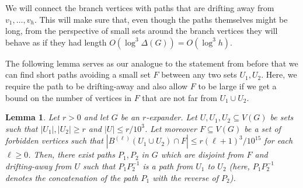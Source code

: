 \documentclass[10pt, a4paper]{article}
\numberwithin{theorem}{section} %
\newtheorem{lemma}[theorem]{Lemma}
\theoremstyle{remark}
\theoremstyle{definition}
\begin{document}
\noindent We will connect the branch vertices with paths that are drifting away from $v_1, \dots, v_h$.
This will make sure that, even though the paths themselves might be long, from the perspective of small sets around the branch vertices they will behave as if they had length $O(\log^3\Delta(G)) = O(\log^3h)$.

The following lemma serves as our analogue to the statement from before that we can find short paths avoiding a small set $F$ between any two sets $U_1, U_2$.
Here, we require the path to be drifting-away and also allow $F$ to be large if we get a bound on the number of vertices in $F$ that are not far from $U_1 \cup U_2$.
\begin{lemma}\label{lemma:drifting_away_paths}
    Let $r > 0$ and let $G$ be an $r$-expander.
    Let $U, U_1, U_2 \subseteq V(G)$ be sets such that $|U_1|, |U_2| \geq r$ and $|U| \leq r/10^3$.
    Let moreover $F \subseteq V(G)$ be a set of forbidden vertices such that $|B^{(\ell)}(U_1 \cup U_2) \cap F| \leq r(\ell+1)^3/10^{15}$ for each $\ell \geq 0$.
    Then, there exist paths $P_1, P_2$ in $G$ which are disjoint from $F$ and drifting-away from $U$ such that $P_1P_2^{-1}$ is a path from $U_1$ to $U_2$ (here, $P_1P_2^{-1}$ denotes the concatenation of the path $P_1$ with the reverse of $P_2$).
\end{lemma}
\end{document}
